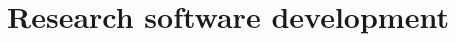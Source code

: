 \documentclass[11pt,a4paper]{report}
\begin{document}



    \section*{Research software development}
\end{document}
